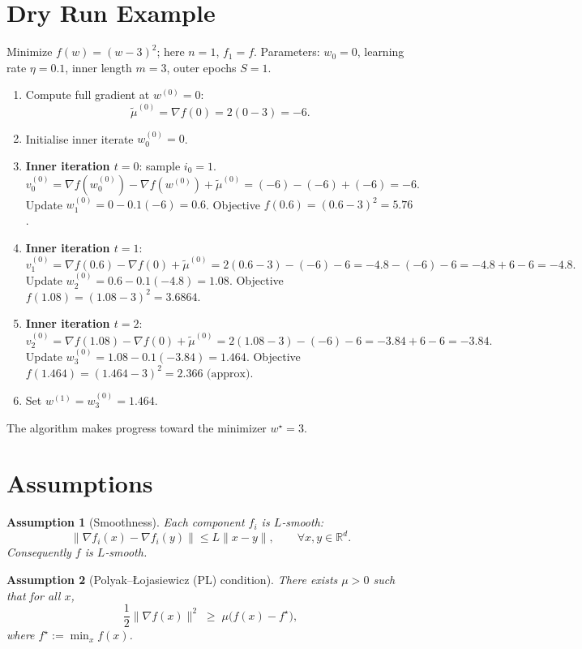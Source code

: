\documentclass{article}
\newtheorem{assumption}{Assumption}
\begin{document}
\section*{Dry Run Example}
Minimize $f(w)=(w-3)^2$; here $n=1$, $f_1=f$.  
Parameters: $w_0=0$, learning rate $\eta=0.1$, inner length $m=3$, outer epochs $S=1$.

\begin{enumerate}[label=\textbf{Step \arabic*.}]
\item Compute full gradient at $w^{(0)}=0$:
\[
\tilde{\mu}^{(0)}=\nabla f(0)=2(0-3)=-6 .
\]
\item Initialise inner iterate $w_0^{(0)}=0$.
\item \textbf{Inner iteration $t=0$}: sample $i_0=1$.
\[
v_0^{(0)}=\nabla f(w_0^{(0)})-\nabla f(w^{(0)})+\tilde{\mu}^{(0)}
          =(-6)-(-6)+(-6)=-6 .
\]
Update $w_1^{(0)}=0-0.1(-6)=0.6$.
Objective $f(0.6)=(0.6-3)^2=5.76$.
\item \textbf{Inner iteration $t=1$}:
\[
v_1^{(0)}=\nabla f(0.6)-\nabla f(0)+\tilde{\mu}^{(0)}
        =2(0.6-3)-(-6)-6 = -4.8-(-6)-6 = -4.8+6-6 = -4.8 .
\]
Update $w_2^{(0)}=0.6-0.1(-4.8)=1.08$.
Objective $f(1.08)=(1.08-3)^2=3.6864$.
\item \textbf{Inner iteration $t=2$}:
\[
v_2^{(0)}=\nabla f(1.08)-\nabla f(0)+\tilde{\mu}^{(0)}
        =2(1.08-3)-(-6)-6 = -3.84+6-6 = -3.84 .
\]
Update $w_3^{(0)}=1.08-0.1(-3.84)=1.464$.
Objective $f(1.464)=(1.464-3)^2=2.366\text{ (approx)}$.
\item Set $w^{(1)}=w_3^{(0)}=1.464$.
\end{enumerate}
The algorithm makes progress toward the minimizer $w^\star=3$.

\newpage
\section*{Assumptions}
\begin{assumption}[Smoothness]\label{ass:smooth}
Each component $f_i$ is $L$‑smooth:
\[
\|\nabla f_i(x)-\nabla f_i(y)\|\le L\|x-y\|,\qquad \forall x,y\in\mathbb{R}^d .
\]
Consequently $f$ is $L$‑smooth.
\end{assumption}

\begin{assumption}[Polyak–Łojasiewicz (PL) condition]\label{ass:PL}
There exists $\mu>0$ such that for all $x$,
\[
\frac{1}{2}\|\nabla f(x)\|^2 \;\ge\; \mu\bigl(f(x)-f^\star\bigr),
\]
where $f^\star:=\min_x f(x)$.
\end{assumption}
\end{document}
